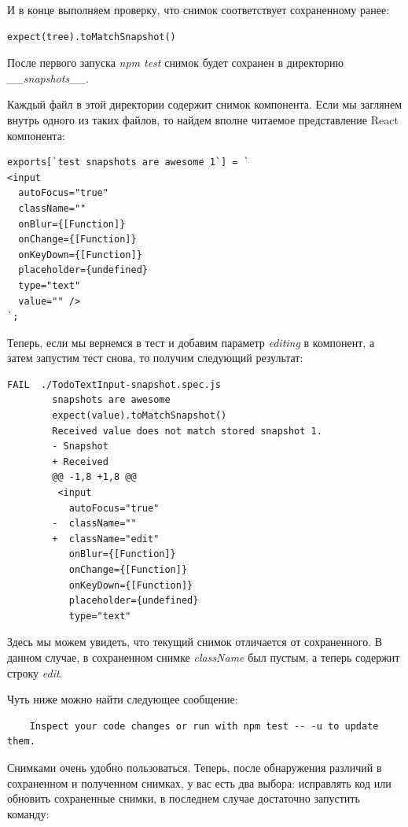 И в конце выполняем проверку, что снимок соответствует сохраненному ранее:

\begin{lstlisting}
expect(tree).toMatchSnapshot()
\end{lstlisting}

После первого запуска \textit{npm test} снимок будет сохранен в директорию \textit{\_\_snapshots\_\_}.

Каждый файл в этой директории содержит снимок компонента. Если мы заглянем внутрь одного из таких файлов, то найдем вполне читаемое представление React компонента:

\begin{lstlisting}
exports[`test snapshots are awesome 1`] = `
<input
  autoFocus="true"
  className=""
  onBlur={[Function]}
  onChange={[Function]}
  onKeyDown={[Function]}
  placeholder={undefined}
  type="text"
  value="" />
`;
\end{lstlisting}

Теперь, если мы вернемся в тест и добавим параметр \textit{editing} в компонент, а затем запустим тест снова, то получим следующий результат:

\begin{lstlisting}
FAIL  ./TodoTextInput-snapshot.spec.js
        snapshots are awesome
        expect(value).toMatchSnapshot()
        Received value does not match stored snapshot 1.
        - Snapshot
        + Received
        @@ -1,8 +1,8 @@
         <input
           autoFocus="true"
        -  className=""
        +  className="edit"
           onBlur={[Function]}
           onChange={[Function]}
           onKeyDown={[Function]}
           placeholder={undefined}
           type="text"
\end{lstlisting}

Здесь мы можем увидеть, что текущий снимок отличается от сохраненного. В данном случае, в сохраненном снимке \textit{className} был пустым, а теперь содержит строку \textit{edit}.

Чуть ниже можно найти следующее сообщение:

\begin{lstlisting}
	Inspect your code changes or run with npm test -- -u to update them.
\end{lstlisting}

Снимками очень удобно пользоваться. Теперь, после обнаружения различий в сохраненном и полученном снимках, у вас есть два выбора: исправлять код или обновить сохраненные снимки, в последнем случае достаточно запустить команду: 

